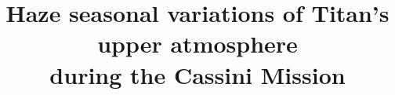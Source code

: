 \documentclass[twocolumn]{aastex63}
\begin{document}
\title{Haze seasonal variations of Titan's upper atmosphere\\during the Cassini Mission}













\end{document}
